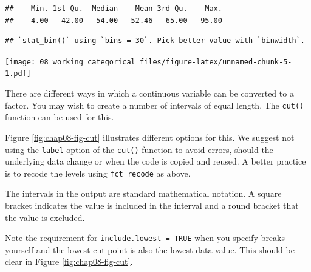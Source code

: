 \documentclass[
  12pt,
  krantz2]{krantz}
\makeatletter
\newenvironment{Shaded}{\begin{snugshade}}{\end{snugshade}}
\newcommand{\CommentTok}[1]{\textcolor[rgb]{0.56,0.35,0.01}{\textit{#1}}}
\newcommand{\DataTypeTok}[1]{\textcolor[rgb]{0.13,0.29,0.53}{#1}}
\newcommand{\KeywordTok}[1]{\textcolor[rgb]{0.13,0.29,0.53}{\textbf{#1}}}
\newcommand{\NormalTok}[1]{#1}
\newcommand{\OperatorTok}[1]{\textcolor[rgb]{0.81,0.36,0.00}{\textbf{#1}}}
\newcommand{\StringTok}[1]{\textcolor[rgb]{0.31,0.60,0.02}{#1}}
\newenvironment{kframe}{%
\medskip{}
\setlength{\fboxsep}{.8em}
 \def\at@end@of@kframe{}%
 \ifinner\ifhmode%
  \def\at@end@of@kframe{\end{minipage}}%
  \begin{minipage}{\columnwidth}%
 \fi\fi%
 \def\FrameCommand##1{\hskip\@totalleftmargin \hskip-\fboxsep
 \colorbox{shadecolor}{##1}\hskip-\fboxsep
     \hskip-\linewidth \hskip-\@totalleftmargin \hskip\columnwidth}%
 \MakeFramed {\advance\hsize-\width
   \@totalleftmargin\z@ \linewidth\hsize
   \@setminipage}}%
 {\par\unskip\endMakeFramed%
 \at@end@of@kframe}
\renewenvironment{Shaded}{\begin{kframe}}{\end{kframe}}
\makeatother
\begin{document}
\begin{Shaded}
\end{Shaded}

\begin{verbatim}
##    Min. 1st Qu.  Median    Mean 3rd Qu.    Max. 
##    4.00   42.00   54.00   52.46   65.00   95.00
\end{verbatim}

\begin{Shaded}
\end{Shaded}

\begin{verbatim}
## `stat_bin()` using `bins = 30`. Pick better value with `binwidth`.
\end{verbatim}

\texttt{[image: 08\_working\_categorical\_files/figure-latex/unnamed-chunk-5-1.pdf]}

There are different ways in which a continuous variable can be converted to a factor.
You may wish to create a number of intervals of equal length.
The \texttt{cut()} function can be used for this.

Figure \ref{fig:chap08-fig-cut} illustrates different options for this.
We suggest not using the \texttt{label} option of the \texttt{cut()} function to avoid errors, should the underlying data change or when the code is copied and reused.
A better practice is to recode the levels using \texttt{fct\_recode} as above.

The intervals in the output are standard mathematical notation.
A square bracket indicates the value is included in the interval and a round bracket that the value is excluded.

Note the requirement for \texttt{include.lowest\ =\ TRUE} when you specify breaks yourself and the lowest cut-point is also the lowest data value.
This should be clear in Figure \ref{fig:chap08-fig-cut}.
\end{document}
